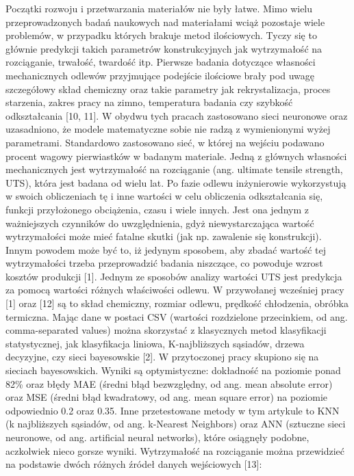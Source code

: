 Początki rozwoju i przetwarzania materiałów nie były łatwe. Mimo wielu przeprowadzonych badań naukowych nad materiałami wciąż pozostaje wiele problemów, w przypadku których brakuje metod ilościowych. Tyczy się to głównie predykcji takich parametrów konstrukcyjnych jak wytrzymałość na rozciąganie, trwałość, twardość itp. Pierwsze badania dotyczące własności mechanicznych odlewów przyjmujące podejście ilościowe brały pod uwagę szczegółowy skład chemiczny oraz takie parametry jak rekrystalizacja, proces starzenia, zakres pracy na zimno, temperatura badania czy szybkość odkształcania [10, 11]. W obydwu tych pracach zastosowano sieci neuronowe oraz uzasadniono, że modele matematyczne sobie nie radzą z wymienionymi wyżej parametrami. Standardowo zastosowano sieć, w której na wejściu podawano procent wagowy pierwiastków w badanym materiale. 
Jedną z głównych własności mechanicznych jest wytrzymałość na rozciąganie (ang. ultimate tensile strength, UTS), która jest badana od wielu lat. Po fazie odlewu inżynierowie wykorzystują w swoich obliczeniach tę i inne wartości w celu obliczenia odkształcania się, funkcji przyłożonego obciążenia, czasu i wiele innych. Jest ona jednym z ważniejszych czynników do uwzględnienia, gdyż niewystarczająca wartość wytrzymałości może mieć fatalne skutki (jak np. zawalenie się konstrukcji). Innym powodem może być to, iż jedynym sposobem, aby zbadać wartość tej wytrzymałości trzeba przeprowadzić badania niszczące, co powoduje wzrost kosztów produkcji [1]. Jednym ze sposobów analizy wartości UTS jest predykcja za pomocą wartości różnych właściwości odlewu. W przywołanej wcześniej pracy [1] oraz [12] są to skład chemiczny, rozmiar odlewu, prędkość chłodzenia, obróbka termiczna. Mając dane w postaci CSV (wartości rozdzielone przecinkiem, od ang. comma-separated values) można skorzystać z klasycznych metod klasyfikacji statystycznej, jak klasyfikacja liniowa, K-najbliższych sąsiadów, drzewa decyzyjne, czy sieci bayesowskie [2]. W przytoczonej pracy skupiono się na sieciach bayesowskich. Wyniki są optymistyczne: dokładność na poziomie ponad 82\% oraz błędy MAE (średni błąd bezwzględny, od ang. mean absolute error) oraz MSE (średni błąd kwadratowy, od ang. mean square error) na poziomie odpowiednio 0.2 oraz 0.35. Inne przetestowane metody w tym artykule to KNN (k najbliższych sąsiadów, od ang. k-Nearest Neighbors) oraz ANN (sztuczne sieci neuronowe, od ang. artificial neural networks), które osiągnęły podobne, aczkolwiek nieco gorsze wyniki. 
Wytrzymałość na rozciąganie można przewidzieć na podstawie dwóch różnych źródeł danych wejściowych [13]:
